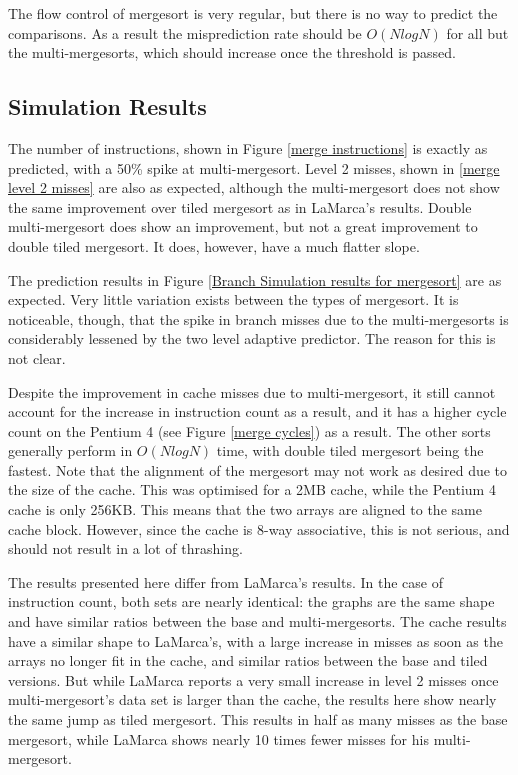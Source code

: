 The flow control of mergesort is very regular, but there is no way to predict
the comparisons. As a result the misprediction rate should be $O(NlogN)$ for
all but the multi-mergesorts, which should increase once the threshold is
passed.

\subsection{Simulation Results}
\label{Mergesort results}


The number of instructions, shown in Figure \ref{merge instructions} is exactly
as predicted, with a 50\% spike at multi-mergesort. Level 2 misses, shown in
\ref{merge level 2 misses} are also as expected, although the multi-mergesort
does not show the same improvement over tiled mergesort as in LaMarca's results.
Double multi-mergesort does show an improvement, but not a great improvement to
double tiled mergesort. It does, however, have a much flatter slope.

The prediction results in Figure \ref{Branch Simulation results for mergesort}
are as expected. Very little variation exists between the types of mergesort. It
is noticeable, though, that the spike in branch misses due to the
multi-mergesorts is considerably lessened by the two level adaptive predictor.
The reason for this is not clear.

Despite the improvement in cache misses due to multi-mergesort, it still cannot
account for the increase in instruction count as a result, and it has a higher
cycle count on the Pentium 4 (see Figure \ref{merge cycles}) as a result. The
other sorts generally perform in $O(NlogN)$ time, with double tiled mergesort
being the fastest. Note that the alignment of the mergesort may not work as
desired due to the size of the cache. This was optimised for a 2MB cache, while
the Pentium 4 cache is only 256KB. This means that the two arrays are aligned to
the same cache block. However, since the cache is 8-way associative, this is not
serious, and should not result in a lot of thrashing.

The results presented here differ from LaMarca's results. In the case of
instruction count, both sets are nearly identical: the graphs are the same shape
and have similar ratios between the base and multi-mergesorts. The cache results
have a similar shape to LaMarca's, with a large increase in misses as soon as
the arrays no longer fit in the cache, and similar ratios between the base and
tiled versions.  But while LaMarca reports a very small increase in level 2
misses once multi-mergesort's data set is larger than the cache, the results
here show nearly the same jump as tiled mergesort. This results in half as many
misses as the base mergesort, while LaMarca shows nearly 10 times fewer misses
for his multi-mergesort.

